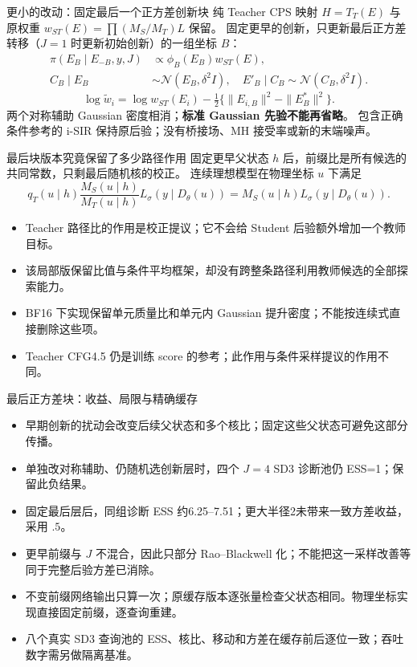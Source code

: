 \documentclass[10pt,aspectratio=169]{beamer}
\newcommand{\N}{\mathcal N}
\begin{document}
\begin{frame}{更小的改动：固定最后一个正方差创新块}
\small
纯 Teacher CPS 映射 $H=T_T(E)$ 与原权重 $w_{ST}(E)=\prod(M_S/M_T)L$ 保留。
固定更早的创新，只更新最后正方差转移（$J=1$ 时更新初始创新）的一组坐标 $B$：
\begin{align}
\pi(E_B\mid E_{-B},y,J)&\propto\phi_B(E_B)w_{ST}(E),\\
C_B\mid E_B&\sim\N(E_B,\delta^2 I),\quad E'_B\mid C_B\sim\N(C_B,\delta^2 I).
\end{align}
\begin{equation}
\log\widetilde w_i=\log w_{ST}(E_i)
-\tfrac12\{\|E_{i,B}\|^2-\|E^*_{B}\|^2\}.
\end{equation}
两个对称辅助 Gaussian 密度相消；\textbf{标准 Gaussian 先验不能再省略}。
包含正确条件参考的 i-SIR 保持原后验；没有桥接场、MH 接受率或新的末端噪声。
\end{frame}

\begin{frame}{最后块版本究竟保留了多少路径作用}
\small
固定更早父状态 $h$ 后，前缀比是所有候选的共同常数，只剩最后随机核的校正。
连续理想模型在物理坐标 $u$ 下满足
\begin{equation}
q_T(u\mid h)\frac{M_S(u\mid h)}{M_T(u\mid h)}
L_\sigma(y\mid D_\theta(u))
=M_S(u\mid h)L_\sigma(y\mid D_\theta(u)).
\end{equation}
\begin{itemize}\itemsep5pt
\item Teacher 路径比的作用是校正提议；它不会给 Student 后验额外增加一个教师目标。
\item 该局部版保留比值与条件平均框架，却没有跨整条路径利用教师候选的全部探索能力。
\item BF16 下实现保留单元质量比和单元内 Gaussian 提升密度；不能按连续式直接删除这些项。
\item Teacher CFG4.5 仍是训练 score 的参考；此作用与条件采样提议的作用不同。
\end{itemize}
\end{frame}

\begin{frame}{最后正方差块：收益、局限与精确缓存}
\small
\begin{itemize}\itemsep5pt
\item 早期创新的扰动会改变后续父状态和多个核比；固定这些父状态可避免这部分传播。
\item 单独改对称辅助、仍随机选创新层时，四个 $J=4$ SD3 诊断池仍 ESS=1；保留此负结果。
\item 固定最后层后，同组诊断 ESS 约6.25--7.51；更大半径2未带来一致方差收益，采用 $.5$。
\item 更早前缀与 $J$ 不混合，因此只部分 Rao--Blackwell 化；不能把这一采样改善等同于完整后验方差已消除。
\item 不变前缀网络输出只算一次；原缓存版本逐张量检查父状态相同。物理坐标实现直接固定前缀，逐查询重建。
\item 八个真实 SD3 查询池的 ESS、核比、移动和方差在缓存前后逐位一致；吞吐数字需另做隔离基准。
\end{itemize}
\end{frame}
\end{document}
